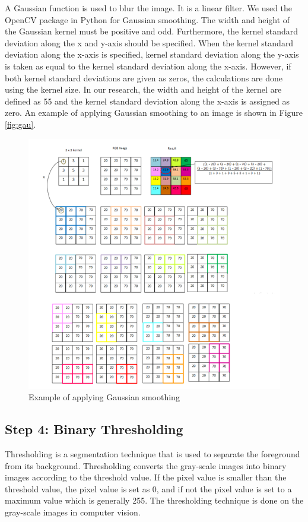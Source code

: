 \documentclass{article}
\begin{document}
A Gaussian function is used to blur the image. It is a linear filter. We used the OpenCV package in Python for Gaussian smoothing. The width and height of the Gaussian kernel must be positive and odd. Furthermore, the kernel standard deviation along the x and y-axis should be specified. When the kernel
standard deviation along the x-axis is specified, kernel standard deviation
along the y-axis is taken as equal to the kernel standard deviation
along the x-axis. However, if both kernel standard deviations are given as zeros,
the calculations are done using the kernel size. In our research, the width
and height of the kernel are defined as 55 and the kernel standard
deviation along the x-axis is assigned as zero. An example of applying
Gaussian smoothing to an image is shown in Figure \ref{fig:gau}.

\begin{figure}[!ht]

{\centering \includegraphics[width=0.6\linewidth]{Figures/gau} 

}

\caption{\label{fig:gau}Example of applying Gaussian smoothing}\label{fig:unnamed-chunk-3}
\end{figure}

\hypertarget{step-4-binary-thresholding}{%
\subsection{Step 4: Binary
Thresholding}\label{step-4-binary-thresholding}}

Thresholding is a segmentation technique that is used to separate
the foreground from its background. Thresholding converts the gray-scale images
into binary images according to the threshold value. If the pixel value is
smaller than the threshold value, the pixel value is set as 0, and if
not the pixel value is set to a maximum value which is generally 255.
The thresholding technique is done on the gray-scale images in computer vision.
\end{document}
